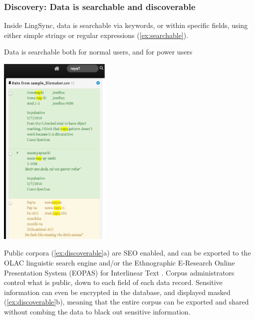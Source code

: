 \documentclass[letterpaper, 12pt, dvips]{mitwpl}
\begin{document}
\subsubsection{\textbf{Discovery}: Data is searchable and discoverable}
 
Inside LingSync, data is searchable via keywords, or within specific fields, using either simple strings or regular expressions (\ref{ex:searchable}). 
\begin{exe} 
\ex Data is searchable both for normal users, and for power users

 \centering
    \includegraphics[width=0.4\textwidth]{searchable}

\label{ex:searchable}
\end{exe}

Public  corpora (\ref{ex:discoverable}a) are SEO enabled, and can be exported to the OLAC linguistic search engine \citep{OLAC:2006:Online} and/or the Ethnographic E-Research Online Presentation System (EOPAS) for Interlinear Text \citep{Schroeter:2006}. Corpus administrators  control what is public, down to each field of each data record. Sensitive information can even be encrypted in the database, and displayed masked (\ref{ex:discoverable}b), meaning that the entire corpus can be exported and shared without combing the data to black out sensitive information. 
\end{document}
